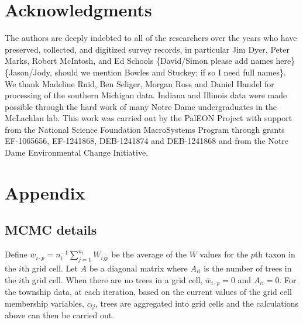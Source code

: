 \documentclass[12pt]{article}\usepackage[]{graphicx}\usepackage[]{color}
\begin{document}
\section*{Acknowledgments}

The authors are deeply indebted to all of the researchers over the
years who have preserved, collected, and digitized survey records,
in particular Jim Dyer, Peter Marks, Robert McIntosh, and Ed Schools
\{David/Simon please add names here\}\{Jason/Jody, should we mention
Bowles and Stuckey; if so I need full names\}. We thank Madeline Ruid,
Ben Seliger, Morgan Ross and Daniel Handel for processing of the southern
Michigan data. Indiana and Illinois data were made possible through
the hard work of many Notre Dame undergraduates in the McLachlan lab.
This work was carried out by the PalEON Project with support from
the National Science Foundation MacroSystems Program through grants
EF-1065656, EF-1241868, DEB-1241874 and DEB-1241868 and from the Notre
Dame Environmental Change Initiative. 

%





\section{Appendix}


\subsection{MCMC details}

Define $\bar{w}_{i\cdot p}=n_{i}^{-1}{\displaystyle \sum_{j=1}^{n_{i}}W_{ijp}}$
be the average of the $W$ values for the $p$th taxon in the $i$th
grid cell. Let $A$ be a diagonal matrix where $A_{ii}$ is the number
of trees in the $i$th grid cell. When there are no trees in a grid
cell, $\bar{w}_{i\cdot p}=0$ and $A_{ii}=0$. For the township data,
at each iteration, based on the current values of the grid cell membership
variables, $c_{tj}$, trees are aggregated into grid cells and the
calculations above can then be carried out.
\end{document}
